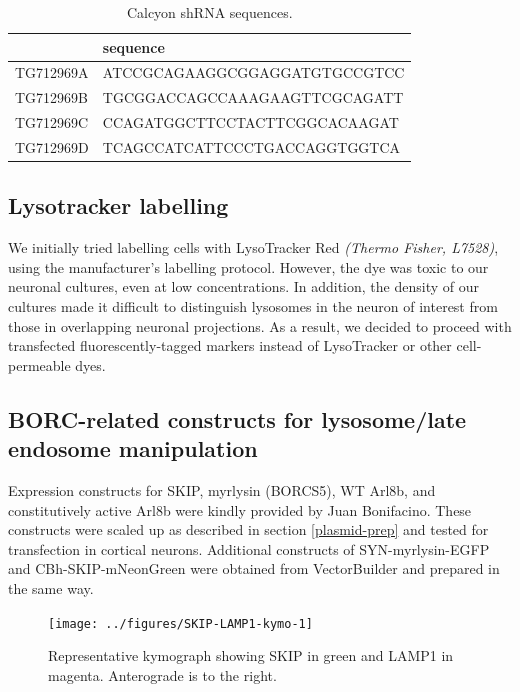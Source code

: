 \documentclass[
  12pt,
  a4paper,
]{book}
\begin{document}
\begin{table}

\caption{\label{tab:caly-tab}Calcyon shRNA sequences.}
\centering
\begin{tabular}[t]{ll}
\toprule
  & sequence\\
\midrule
TG712969A & ATCCGCAGAAGGCGGAGGATGTGCCGTCC\\
TG712969B & TGCGGACCAGCCAAAGAAGTTCGCAGATT\\
TG712969C & CCAGATGGCTTCCTACTTCGGCACAAGAT\\
TG712969D & TCAGCCATCATTCCCTGACCAGGTGGTCA\\
\bottomrule
\end{tabular}
\end{table}

\hypertarget{lysotracker-labelling}{%
\subsection{Lysotracker labelling}\label{lysotracker-labelling}}

We initially tried labelling cells with LysoTracker Red \emph{(Thermo Fisher, L7528)}, using the manufacturer's labelling protocol. However, the dye was toxic to our neuronal cultures, even at low concentrations. In addition, the density of our cultures made it difficult to distinguish lysosomes in the neuron of interest from those in overlapping neuronal projections. As a result, we decided to proceed with transfected fluorescently-tagged markers instead of LysoTracker or other cell-permeable dyes.

\hypertarget{borc-related-constructs-for-lysosomelate-endosome-manipulation}{%
\subsection{BORC-related constructs for lysosome/late endosome manipulation}\label{borc-related-constructs-for-lysosomelate-endosome-manipulation}}

Expression constructs for SKIP, myrlysin (BORCS5), WT Arl8b, and constitutively active Arl8b were kindly provided by Juan Bonifacino. These constructs were scaled up as described in section \ref{plasmid-prep} and tested for transfection in cortical neurons. Additional constructs of SYN-myrlysin-EGFP and CBh-SKIP-mNeonGreen were obtained from VectorBuilder and prepared in the same way.

\begin{figure}
\texttt{[image: ../figures/SKIP-LAMP1-kymo-1]} \caption[SKIP and LAMP1 representative kymograph]{Representative kymograph showing SKIP in green and LAMP1 in magenta.  Anterograde is to the right.}\label{fig:SKIP-LAMP1-kymo}
\end{figure}
\end{document}
